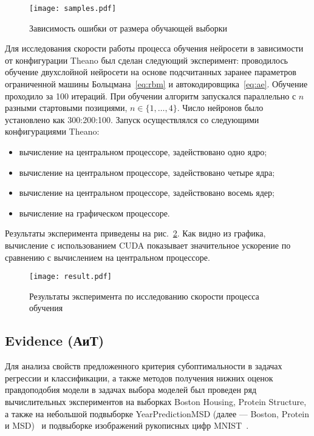 \begin{figure}[tb!]
 \centering
  \texttt{[image: samples.pdf]}
 \caption{Зависимость ошибки от размера обучающей выборки}
 \label{fig:samples}
\end{figure}


Для исследования скорости работы процесса обучения нейросети в зависимости от конфигурации Theano был сделан следующий эксперимент:
проводилось обучение двухслойной нейросети на основе подсчитанных заранее параметров ограниченной машины Больцмана~\eqref{eq:rbm} и автокодировщика~\eqref{eq:ae}. Обучение проходило за 100 итераций. При обучении алгоритм запускался параллельно с $n$ разными стартовыми позициями, $n \in \{1,\dots,4\}.$ Число нейронов было установлено как 300:200:100.
Запуск осуществлялся со следующими конфигурациями Theano:
\begin{itemize}
\item вычисление на центральном процессоре, задействовано
одно ядро;
\item вычисление на центральном процессоре, задействовано четыре ядра;
\item вычисление на центральном процессоре, задействовано восемь ядер;
\item вычисление на графическом процессоре.
\end{itemize}

Результаты эксперимента приведены на рис.~\ref{fig:speed}. Как видно из графика, вычисление с использованием CUDA показывает значительное ускорение по сравнению с вычислением на центральном процессоре.

\begin{figure}[tb!]
 \centering
  \texttt{[image: result.pdf]}
 \caption{Результаты эксперимента по исследованию скорости процесса обучения}
 \label{fig:speed}
\end{figure}



\subsection{Evidence (АиТ)}
Для анализа свойств предложенного критерия субоптимальности в задачах регрессии и классификации, а также методов получения нижних оценок правдоподобия модели в задачах выбора моделей был проведен ряд вычислительных экспериментов на выборках Boston Housing, Protein Structure, а также на небольшой подвыборке YearPredictionMSD (далее --- Boston, Protein и MSD)~\cite{UCI} {и подвыборке изображений рукописных цифр MNIST~\cite{mnist}}.

